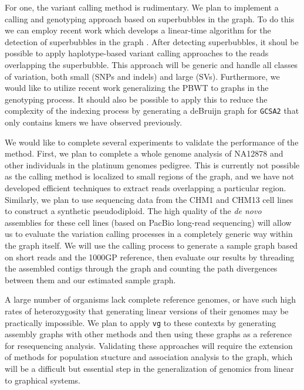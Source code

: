\documentclass{article}
\begin{document}
For one, the variant calling method is rudimentary.
We plan to implement a calling and genotyping approach based on superbubbles in the graph.
To do this we can employ recent work which develops a linear-time algorithm for the detection of superbubbles in the graph \cite{brankovic2016linear}.
After detecting superbubbles, it shoul be possible to apply haplotype-based variant calling approaches \cite{garrison2012haplotype} to the reads overlapping the superbubble.
This approach will be generic and handle all classes of variation, both small (SNPs and indels) and large (SVs).
Furthermore, we would like to utilize recent work generalizing the PBWT to graphs in the genotyping process.
It should also be possible to apply this to reduce the complexity of the indexing process by generating a deBruijn graph for {\tt GCSA2} that only contains kmers we have observed previously.

We would like to complete several experiments to validate the performance of the method.
First, we plan to complete a whole genome analysis of NA12878 and other individuals in the platinum genomes pedigree.
This is currently not possible as the calling method is localized to small regions of the graph, and we have not developed efficient techniques to extract reads overlapping a particular region.
Similarly, we plan to use sequencing data from the CHM1 and CHM13 cell lines to construct a synthetic pseudodiploid.
The high quality of the \emph{de novo} assemblies for these cell lines (based on PacBio long-read sequencing) will allow us to evaluate the variation calling processes in a completely generic way within the graph itself.
We will use the calling process to generate a sample graph based on short reads and the 1000GP reference, then evaluate our results by threading the assembled contigs through the graph and counting the path divergences between them and our estimated sample graph.

A large number of organisms lack complete reference genomes, or have such high rates of heterozygosity that generating linear versions of their genomes may be practically impossible.
We plan to apply {\tt vg} to these contexts by generating assembly graphs with other methods and then using these graphs as a reference for resequencing analysis.
Validating these approaches will require the extension of methods for population stucture and association analysis to the graph, which will be a difficult but essential step in the generalization of genomics from linear to graphical systems.

\end{document}
